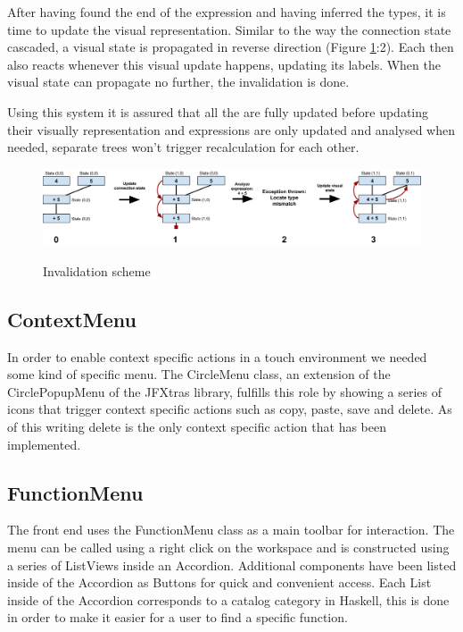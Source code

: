 After having found the end of the expression and having inferred the types, it is time to update the visual representation. Similar to the way the connection state cascaded, a visual state is propagated in reverse direction (Figure \ref{fig:invalidation}:2). Each  then also reacts whenever this visual update happens, updating its labels. When the visual state can propagate no further, the invalidation is done.

Using this system it is assured that all the  are fully updated before updating their visually representation and expressions are only updated and analysed when needed, separate trees won't trigger recalculation for each other.

\begin{figure}[h]
	\centering
	\includegraphics[scale=0.23]{Images/invalidation}
	\label{fig:invalidation}
	\caption{Invalidation scheme}
\end{figure}

\subsection{ContextMenu}

In order to enable context specific actions in a touch environment we needed some kind of specific menu.
The CircleMenu class, an extension of the CirclePopupMenu of the JFXtras library, fulfills this role by showing a series of icons that trigger context specific actions such as copy, paste, save and delete.
As of this writing delete is the only context specific action that has been implemented.

\subsection{FunctionMenu}

The front end uses the FunctionMenu class as a main toolbar for interaction.
The menu can be called using a right click on the workspace and is constructed using a series of ListViews inside an Accordion.
Additional components have been listed inside of the Accordion as Buttons for quick and convenient access.
Each List inside of the Accordion corresponds to a catalog category in Haskell, this is done in order to make it easier for a user
to find a specific function.

